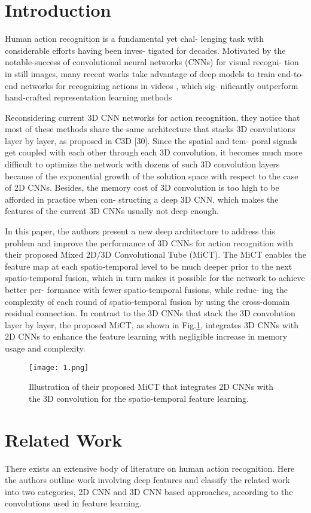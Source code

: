 \documentclass[10pt,twocolumn,letterpaper]{article}
\begin{document}
\section{Introduction}
Human action recognition is a fundamental yet chal-
lenging task with considerable efforts having been inves-
tigated for decades. Motivated by the notable-success of
convolutional neural networks (CNNs) for visual recogni-
tion in still images, many recent works take advantage of
deep models to train end-to-end networks for recognizing
actions in videos \cite{simonyan2014two,feichtenhofer2016spatiotemporal,wang2016temporal,yue2015beyond,tran2015learning}, which sig-
nificantly outperform hand-crafted representation learning
methods \cite{wang2013action,wang2011action,laptev2008learning}
\par
Reconsidering current 3D CNN networks for action
recognition, they notice that most of these methods share
the same architecture that stacks 3D convolutions layer by
layer, as proposed in C3D [30]. Since the spatial and tem-
poral signals get coupled with each other through each 3D
convolution, it becomes much more difficult to optimize the
network with dozens of such 3D convolution layers because
of the exponential growth of the solution space with respect
to the case of 2D CNNs. Besides, the memory cost of 3D
convolution is too high to be afforded in practice when con-
structing a deep 3D CNN, which makes the features of the
current 3D CNNs usually not deep enough.
\par
In this paper, the authors present a new deep architecture to
address this problem and improve the performance of 3D
CNNs for action recognition with their proposed Mixed
2D/3D Convolutional Tube (MiCT). The MiCT enables
the feature map at each spatio-temporal level to be much
deeper prior to the next spatio-temporal fusion, which in
turn makes it possible for the network to achieve better per-
formance with fewer spatio-temporal fusions, while reduc-
ing the complexity of each round of spatio-temporal fusion
by using the cross-domain residual connection. In contrast
to the 3D CNNs that stack the 3D convolution layer by
layer, the proposed MiCT, as shown in Fig.\ref{fig1}, integrates 3D
CNNs with 2D CNNs to enhance the feature learning with
negligible increase in memory usage and complexity.
%
\begin{figure}
	\centering
	\texttt{[image: 1.png]}
	\caption{Illustration of their proposed MiCT that integrates 2D
		CNNs with the 3D convolution for the spatio-temporal feature
		learning.}
	\label{fig1}
\end{figure}
%
\section{Related Work}
There exists an extensive body of literature on human
action recognition. Here the authors outline work involving deep
features and classify the related work into two categories,
2D CNN and 3D CNN based approaches, according to the
convolutions used in feature learning.


\end{document}
